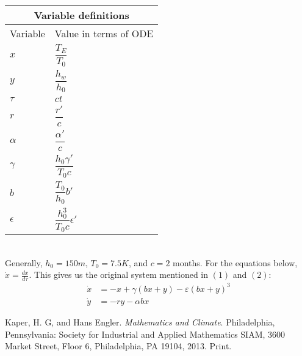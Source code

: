 \documentclass[10pt, letterpaper, answer]{exam}
\begin{document}
\begin{tabular}{ |p{3cm}|p{3cm}| }
\hline
\multicolumn{2}{|c|}{Variable definitions} \\
\hline
Variable & Value in terms of ODE\\
\hline
$x$ & $\dfrac{T_E}{T_0}$  \\
$y$ & $\dfrac{h_w}{h_0}$ \\
$\tau$ &  $ct$ \\
$r$ & $\dfrac{r'}{c}$  \\
$\alpha$ & $\dfrac{\alpha'}{c}$ \\
$\gamma$ & $\dfrac{h_0\gamma'}{T_0c}$   \\
$b$ & $\dfrac{T_0}{h_0}b'$  \\
$\epsilon$ & $\dfrac{h_0^3}{T_0c}\epsilon'$ \\
\hline
\end{tabular} \\

Generally, $h_0 = 150 m$, $T_0 = 7.5 K$, and $c= 2$ months. 
For the equations below, $\dot x=\frac{dx}{d\tau}$. This gives us the original system mentioned in $(1)$ and $(2)$:
\begin{align}
    \dot x & = -x + \gamma (bx + y) - \varepsilon (bx + y)^3 \\
    \dot y & = -ry - \alpha b x
\end{align}


\begin{thebibliography}{9}
Kaper, H. G, and Hans Engler. \emph{Mathematics and Climate}. Philadelphia, Pennsylvania: Society for Industrial and Applied Mathematics SIAM, 3600 Market Street, Floor 6, Philadelphia, PA 19104, 2013. Print.
\end{thebibliography}
\end{document}
